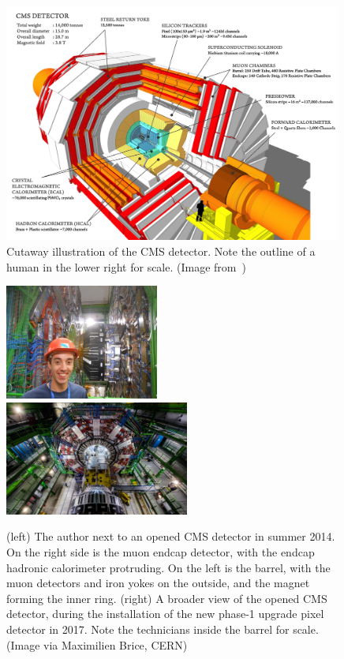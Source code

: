 \begin{figure}[t]
  \begin{center}
    \includegraphics[width=0.99\textwidth]{figs/cms/cms_diagram.png}
    \caption{Cutaway illustration of the CMS detector. Note the outline
      of a human in the lower right for scale. (Image from~\cite{cms_vis})
            }
    \label{fig:cms_diagram}
  \end{center}
\end{figure}

\begin{figure}[t]
  \begin{center}
    \includegraphics[width=0.45\textwidth]{figs/cms/bennett.jpg}
    \includegraphics[width=0.54\textwidth]{figs/cms/cms_photo.jpg}
    \caption{(left) The author next to an opened CMS detector in summer 2014.
      On the right side is the muon endcap detector, with the endcap hadronic calorimeter
      protruding. On the left is the barrel, with the muon detectors and iron yokes
      on the outside, and the magnet forming the inner ring.
      (right) A broader view of the opened CMS detector, during the installation
      of the new phase-1 upgrade pixel detector in 2017. Note the technicians
      inside the barrel for scale. (Image via Maximilien Brice, CERN)
            }
    \label{fig:cms_photos}
  \end{center}
\end{figure}

